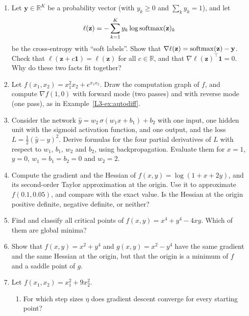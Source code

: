\begin{enumerate}[leftmargin=*]
\begin{enumerate}[label=(\alph*)]
        \item Let $X$ be invertible. Show that $(X + H)^{-1} = X^{-1} - X^{-1}HX^{-1} + o(\norm{H}_F)$, by multiplying the right side by $X + H$. Conclude that $\nabla_X\tr(AX^{-1}) = -X^{-\top}A^\top X^{-\top}$.
    \end{enumerate}
    \item \homework{} Let $\mathbf{y} \in \mathbb{R}^K$ be a probability vector (with $y_k \geq 0$ and $\sum_k y_k = 1$), and let
    \[\ell(\mathbf{z}) = -\sum_{k=1}^K y_k\log\operatorname{softmax}(\mathbf{z})_k\]
    be the cross-entropy with ``soft labels''. Show that $\nabla\ell(\mathbf{z}) = \operatorname{softmax}(\mathbf{z}) - \mathbf{y}$. Check that $\ell(\mathbf{z} + c\mathbf{1}) = \ell(\mathbf{z})$ for all $c \in \mathbb{R}$, and that $\nabla\ell(\mathbf{z})^\top\mathbf{1} = 0$. Why do these two facts fit together?
    \item Let $f(x_1, x_2) = x_1^2 x_2 + e^{x_1 x_2}$. Draw the computation graph of $f$, and compute $\nabla f(1, 0)$ with forward mode (two passes) and with reverse mode (one pass), as in Example~\ref{L3-ex:autodiff}.
    \item \homework{} Consider the network $\hat y = w_2\,\sigma(w_1 x + b_1) + b_2$ with one input, one hidden unit with the sigmoid activation function, and one output, and the loss $L = \frac{1}{2}(\hat y - y)^2$. Derive formulas for the four partial derivatives of $L$ with respect to $w_1$, $b_1$, $w_2$ and $b_2$, using backpropagation. Evaluate them for $x = 1$, $y = 0$, $w_1 = b_1 = b_2 = 0$ and $w_2 = 2$.
    \item Compute the gradient and the Hessian of $f(x, y) = \log(1 + x + 2y)$, and its second-order Taylor approximation at the origin. Use it to approximate $f(0.1, 0.05)$, and compare with the exact value. Is the Hessian at the origin positive definite, negative definite, or neither?
    \item \homework{} Find and classify all critical points of $f(x, y) = x^4 + y^4 - 4xy$. Which of them are global minima?
    \item\label{L3-ex3:inconclusive} Show that $f(x, y) = x^2 + y^4$ and $g(x, y) = x^2 - y^4$ have the same gradient and the same Hessian at the origin, but that the origin is a minimum of $f$ and a saddle point of $g$.
    \item \homework{} Let $f(x_1, x_2) = x_1^2 + 9x_2^2$.
    \begin{enumerate}[label=(\alph*)]
        \item For which step sizes $\eta$ does gradient descent converge for every starting point?

\end{enumerate}
\end{enumerate}
